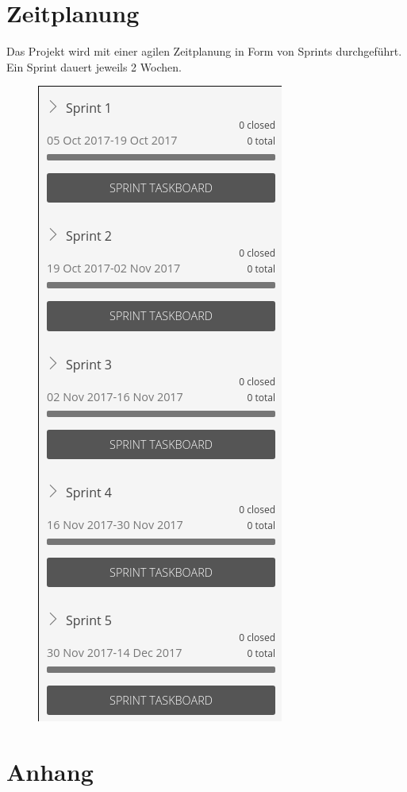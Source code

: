 \documentclass[a4paper, 10pt, fleqn]{article}
\begin{document}
	\section{Zeitplanung}
        Das Projekt wird mit einer agilen Zeitplanung in Form von Sprints durchgeführt. Ein Sprint dauert jeweils 2 Wochen.
        \begin{figure}[H]
            \centering
            \includegraphics[width=.5\textwidth]{sprint_overview.png}
        \end{figure}

    \clearpage
    

    \clearpage
    
	

\clearpage
\thispagestyle{empty}
	\section*{Anhang}
\end{document}

